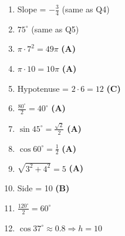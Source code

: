 \documentclass[12pt]{article}
\begin{document}
\begin{enumerate}[label=\textbf{Question \arabic*:}]
  \item Slope = \( -\frac{3}{4} \) (same as Q4)
  \item \( 75^\circ \) (same as Q5)
  \item \( \pi \cdot 7^2 = 49\pi \) \textbf{(A)}
  \item \( \pi \cdot 10 = 10\pi \) \textbf{(A)}
  \item Hypotenuse = \( 2 \cdot 6 = 12 \) \textbf{(C)}
  \item \( \frac{80^\circ}{2} = 40^\circ \) \textbf{(A)}
  \item \( \sin 45^\circ = \frac{\sqrt{2}}{2} \) \textbf{(A)}
  \item \( \cos 60^\circ = \frac{1}{2} \) \textbf{(A)}
  \item \( \sqrt{3^2 + 4^2} = 5 \) \textbf{(A)}
  \item Side = 10 \textbf{(B)}
  \item \( \frac{120^\circ}{2} = 60^\circ \)
  \item \( \cos 37^\circ \approx 0.8 \Rightarrow h = 10 \)
\end{enumerate}

\newpage
\end{document}
